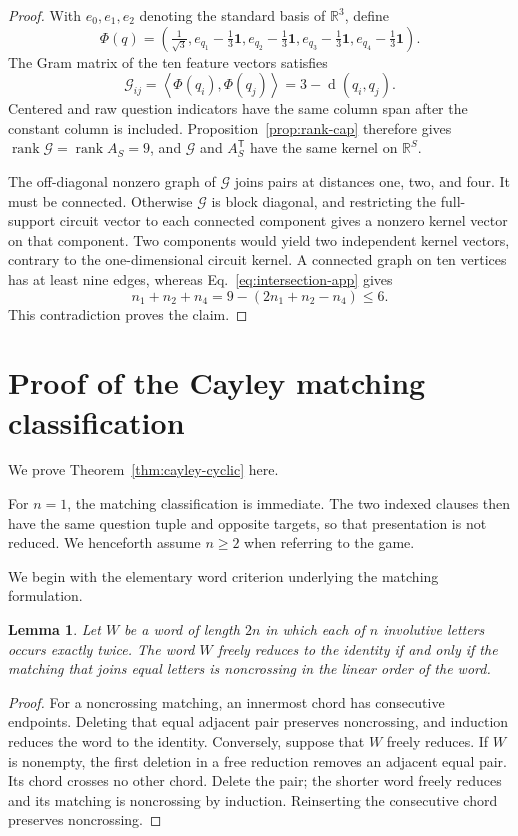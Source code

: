 \documentclass[11pt]{article}
\newtheorem{lemma}[theorem]{Lemma}
\theoremstyle{definition}
\theoremstyle{remark}
\newcommand{\R}{\mathbb{R}}
\newcommand{\one}{\mathbf{1}}
\newcommand{\rank}{\operatorname{rank}}
\newcommand{\dist}{\operatorname{d}}
\newcommand{\inner}[2]{\left\langle #1,#2\right\rangle}
\numberwithin{equation}{section}
\begin{document}
\begin{proof}
With \(e_0,e_1,e_2\) denoting the standard basis of \(\R^3\), define
\[
  \Phi(q)=
  \left(
  \tfrac1{\sqrt3},
  e_{q_1}-\tfrac13\one,
  e_{q_2}-\tfrac13\one,
  e_{q_3}-\tfrac13\one,
  e_{q_4}-\tfrac13\one
  \right).
\]
The Gram matrix of the ten feature vectors satisfies
\[
  \mathcal G_{ij}
  =
  \inner{\Phi(q_i)}{\Phi(q_j)}
  =
  3-\dist(q_i,q_j).
\]
Centered and raw question indicators have the same column span after the
constant column is included.  Proposition~\ref{prop:rank-cap} therefore gives
\(\rank \mathcal G=\rank A_S=9\), and \(\mathcal G\) and
\(A_S^{\mathsf T}\) have the same
kernel on \(\R^S\).

The off-diagonal nonzero graph of \(\mathcal G\) joins pairs at distances one,
two, and four.  It must be connected.  Otherwise \(\mathcal G\) is block
diagonal, and
restricting the full-support circuit vector to each connected component gives
a nonzero kernel vector on that component.  Two components would yield two
independent kernel vectors, contrary to the one-dimensional circuit kernel.
A connected graph on ten vertices has at least nine edges, whereas
Eq.~\eqref{eq:intersection-app} gives
\[
  n_1+n_2+n_4
  =
  9-(2n_1+n_2-n_4)
  \leq6.
\]
This contradiction proves the claim.
\end{proof}

\section{Proof of the Cayley matching classification}
\label{app:cayley-classification}

We prove Theorem~\ref{thm:cayley-cyclic} here.

For \(n=1\), the matching classification is immediate.  The two indexed
clauses then have the same question tuple and opposite targets, so that
presentation is not reduced.  We henceforth assume \(n\geq2\) when referring
to the game.

We begin with the elementary word criterion underlying the matching
formulation.

\begin{lemma}\label{lem:cayley-chord}
Let \(W\) be a word of length \(2n\) in which each of \(n\) involutive
letters occurs exactly twice.  The word \(W\) freely reduces to the identity
if and only if the matching that joins equal letters is noncrossing in the
linear order of the word.
\end{lemma}

\begin{proof}
For a noncrossing matching, an innermost chord has consecutive endpoints.
Deleting that equal adjacent pair preserves noncrossing, and induction
reduces the word to the identity.  Conversely, suppose that \(W\) freely
reduces.  If \(W\) is nonempty, the first deletion in a free reduction
removes an adjacent equal pair.  Its chord crosses no other chord.  Delete
the pair; the shorter word freely reduces and its matching is noncrossing by
induction.  Reinserting the consecutive chord preserves noncrossing.
\end{proof}
\end{document}
